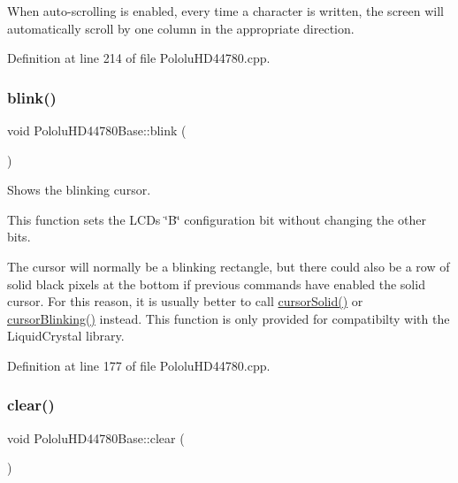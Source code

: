 When auto-\/scrolling is enabled, every time a character is written, the screen will automatically scroll by one column in the appropriate direction. 

Definition at line 214 of file Pololu\+H\+D44780.\+cpp.

\mbox{\label{class_pololu_h_d44780_base_ac6e255adf32d5c70c0163422b1ae8e0c}} 
\subsubsection{\texorpdfstring{blink()}{blink()}}
{\footnotesize\ttfamily void Pololu\+H\+D44780\+Base\+::blink (\begin{DoxyParamCaption}{ }\end{DoxyParamCaption})\hspace{0.3cm}{\ttfamily [inherited]}}

Shows the blinking cursor.

This function sets the L\+CD\textquotesingle{}s \char`\"{}\+B\char`\"{} configuration bit without changing the other bits.

The cursor will normally be a blinking rectangle, but there could also be a row of solid black pixels at the bottom if previous commands have enabled the solid cursor. For this reason, it is usually better to call \hyperlink{class_pololu_h_d44780_base_a6a4d8e79beda9f7c81659a8e13c8c338}{cursor\+Solid()} or \hyperlink{class_pololu_h_d44780_base_a6a53a6cffbb77953b5a2c4ae49e288de}{cursor\+Blinking()} instead. This function is only provided for compatibilty with the Liquid\+Crystal library. 

Definition at line 177 of file Pololu\+H\+D44780.\+cpp.

\mbox{\label{class_pololu_h_d44780_base_a4d35e9a47ceef1a7582e180165e0eae1}} 
\subsubsection{\texorpdfstring{clear()}{clear()}}
{\footnotesize\ttfamily void Pololu\+H\+D44780\+Base\+::clear (\begin{DoxyParamCaption}{ }\end{DoxyParamCaption})\hspace{0.3cm}{\ttfamily [inherited]}}

